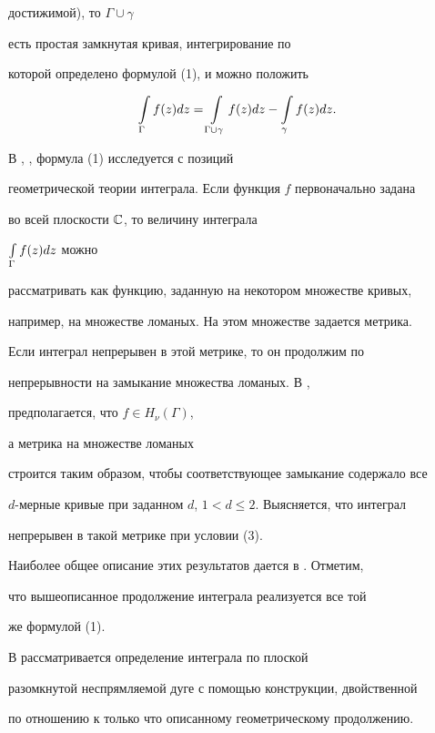 достижимой), то $\Gamma\cup\gamma$ 


есть простая замкнутая кривая, интегрирование по 


которой определено формулой (1), и можно положить 


\begin{equation} 


\intl_\Gamma f(z)dz=\intl_{\Gamma\cup\gamma}f(z)dz- 


\intl_\gamma f(z)dz.


\end{equation} 


В \cite{4}, \cite{5}, \cite{7} формула (1) исследуется с позиций  


геометрической теории интеграла. Если функция $f$ первоначально задана 


во всей плоскости $\Bbb C$, то величину интеграла 


$\int\limits_\Gamma f(z)dz$ можно 


рассматривать как функцию, заданную на некотором множестве кривых, 


например, на множестве ломаных. На этом множестве задается метрика. 


Если интеграл непрерывен в этой метрике, то он продолжим по  


непрерывности на замыкание множества ломаных. В \cite{4}, \cite{5} 


\cite{7} предполагается, что $f\in H_\nu(\Gamma)$, 


а метрика на множестве ломаных 


строится таким образом, чтобы соответствующее замыкание содержало все 


$d$-мерные кривые при заданном $d$, $1<d\le 2$. Выясняется, что интеграл 


непрерывен в такой метрике при условии (3). 


Наиболее общее описание этих результатов дается в \cite{5}. Отметим, 


что вышеописанное продолжение интеграла реализуется все той 


же формулой (1). 


 


В \cite{8} рассматривается определение интеграла по плоской 


разомкнутой неспрямляемой дуге с помощью конструкции, двойственной 


по отношению к только что описанному геометрическому продолжению. 


